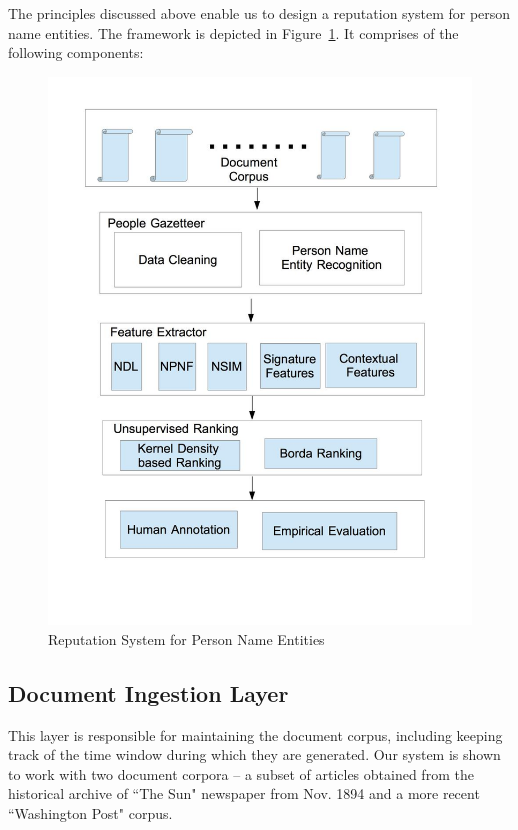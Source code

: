 \documentclass[a4paper,man,natbib]{apa6}
\begin{document}
The principles discussed above enable us to design a reputation system for person name entities. The framework is depicted in Figure~\ref{arch}. It comprises of the following components: 
\begin{figure}[H]
\begin{center}
   \includegraphics[width=0.38\textheight]{arch.jpg}
    \caption{Reputation System for Person Name Entities}
    \label{arch}
\end{center}   
\end{figure}


\subsection{Document Ingestion Layer}
This layer is responsible for maintaining the document corpus, including keeping track of the time window during which they are generated. Our system is shown to work with two document corpora -- a subset of articles obtained from the historical archive of ``The Sun" newspaper from Nov. 1894 and a more recent ``Washington Post" corpus. 
\end{document}
